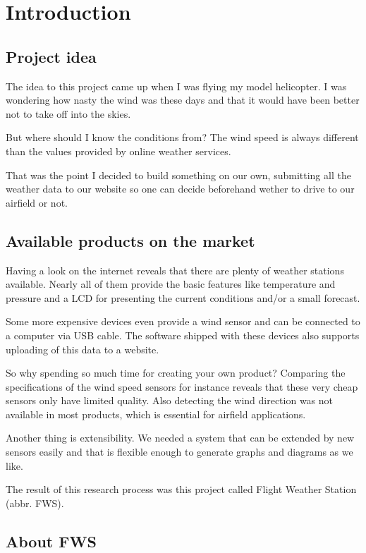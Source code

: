 
\chapter{Introduction}

\section{Project idea}
The idea to this project came up when I was flying my model helicopter. I was wondering how nasty the wind was these days and that it would have been better not to take off into the skies.

But where should I know the conditions from? The wind speed is always different than the values provided by online weather services.

That was the point I decided to build something on our own, submitting all the weather data to our website so one can decide beforehand wether to drive to our airfield or not.

\section{Available products on the market}
Having a look on the internet reveals that there are plenty of weather stations available. Nearly all of them provide the basic features like temperature and pressure and a LCD for presenting the current conditions and/or a small forecast.

Some more expensive devices even provide a wind sensor and can be connected to a computer via USB cable. The software shipped with these devices also supports uploading of this data to a website.

So why spending so much time for creating your own product? Comparing the specifications of the wind speed sensors for instance reveals that these very cheap sensors only have limited quality. Also detecting the wind direction was not available in most products, which is essential for airfield applications.

Another thing is extensibility. We needed a system that can be extended by new sensors easily and that is flexible enough to generate graphs and diagrams as we like.

The result of this research process was this project called Flight Weather Station (abbr. FWS).

\section{About FWS} %
\label{sec:about_fws}


